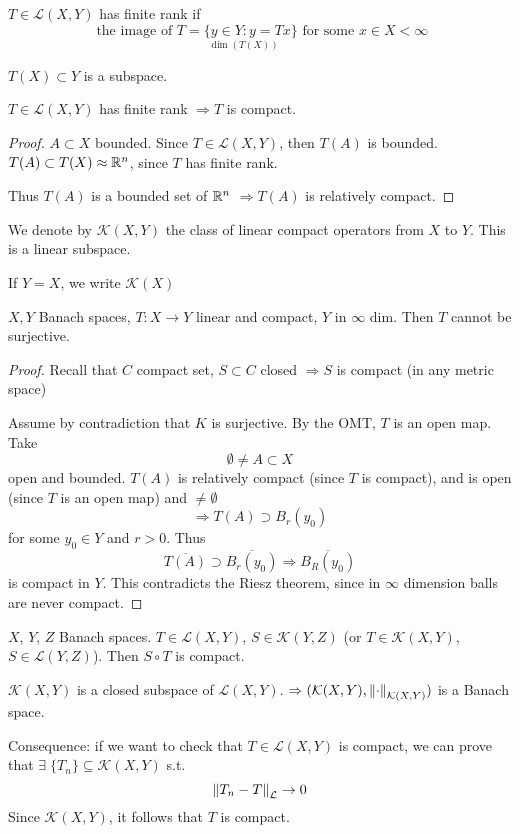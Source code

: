 \begin{definition}
    \(T \in \mathcal{L}(X, Y)\) has finite rank if 
    \[
        \underset{\dim (T(X))}{\text{ the image of }T= \{y \in Y: y = Tx\} \text{ for some } x \in X} < \infty
    \]
\end{definition}
\(T(X) \subset Y\) is a subspace.
\begin{proposition}
    \(T \in \mathcal{L}(X, Y)\) has finite rank \(\Rightarrow T\) is compact.
\end{proposition}
\begin{proof}
    \(A \subset X \) bounded. Since \(T \in \mathcal{L}(X, Y)\), then \(T(A)\) is bounded. \(T(A) \subset T(X) \approx \mathbb{R}^n\), since \(T\) has finite rank. 
    
    Thus \(T(A)\) is a bounded set of \(\mathbb{R}^n\) \(\Rightarrow T(A) \) is relatively compact. 
\end{proof}

\begin{definition}
    We denote by \(\mathcal{K}(X, Y)\) the class of linear compact operators from \(X \) to \(Y\). This is a linear subspace.

    If \(Y=X\), we write \(\mathcal{K}(X)\)
\end{definition}
\begin{proposition}
    \(X, Y\) Banach spaces, \(T:X \to Y\) linear and compact, \(Y\) in \(\infty\) dim. Then \(T\) cannot be surjective.
\end{proposition}
\begin{proof}
    Recall that \(C\) compact set, \(S \subset C\) closed \(\Rightarrow S\) is compact (in any metric space)

    Assume by contradiction that \(K\) is surjective. By the OMT, \(T\) is an open map. Take 
    \[
        \emptyset \neq A \subset X
    \]
    open and bounded. \(T(A)\) is relatively compact (since \(T\) is compact), and is open (since \(T\) is an open map) 
    and \(\neq \emptyset\)
    \[
        \Rightarrow T(A) \supset B_r(y_0)
    \]
    for some \(y_0 \in Y \) and \(r>0\). Thus 
    \[
        \overline{T(A)} \supset \overline{B_r(y_0)} \Rightarrow \overline{B_R(y_0)} 
    \] 
    is compact in \(Y\). This contradicts the Riesz theorem, since in \(\infty\) dimension balls are never compact. 
\end{proof}

\begin{proposition}
    \(X\), \(Y\), \(Z\) Banach spaces. \(T \in \mathcal{L}(X, Y)\), \(S \in \mathcal{K}(Y, Z)\) (or \(T \in \mathcal{K}(X, Y)\), \(S \in \mathcal{L}(Y, Z)\)). Then \(S \circ T\) is compact.
\end{proposition}
\begin{theorem}
    \(\mathcal{K}(X, Y) \) is a closed subspace of \(\mathcal{L}(X, Y)\). \(\Rightarrow (\mathcal{K}(X, Y), \norm{\cdot}_{\mathcal{K}(X, Y)})\) is a Banach space.
\end{theorem}
Consequence: if we want to check that \(T \in \mathcal{L}(X, Y)\) is compact, we can prove that \(\exists\; \{T_n\} \subseteq \mathcal{K}(X, Y)\) s.t. 
\[
    \norm{T_n - T}_{\mathcal{L}} \to 0
\]
Since \(\mathcal{K}(X, Y)\), it follows that \(T\) is compact.
